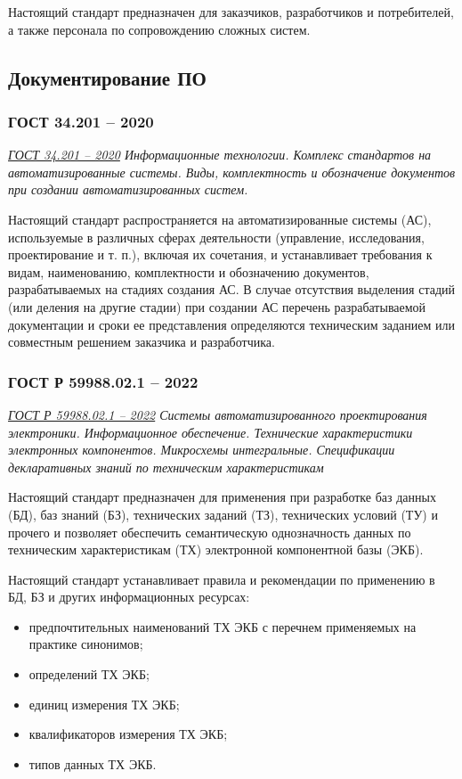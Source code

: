 Настоящий стандарт предназначен для заказчиков,
разработчиков и потребителей,
а также персонала по сопровождению сложных систем.

\subsection{Документирование ПО}

\subsubsection{ГОСТ 34.201 -- 2020}

\emph{\href{https://docs.cntd.ru/document/1200181803}{ГОСТ 34.201 -- 2020}
Информационные технологии.
Комплекс стандартов на автоматизированные системы.
Виды, комплектность и обозначение документов
при создании автоматизированных систем.
}

Настоящий стандарт распространяется на автоматизированные системы (АС),
используемые в различных сферах деятельности
(управление, исследования, проектирование и т. п.), включая их сочетания,
и устанавливает требования к видам, наименованию,
комплектности и обозначению документов, разрабатываемых на стадиях создания АС.
В случае отсутствия выделения стадий (или деления на другие стадии)
при создании АС перечень разрабатываемой документации
и сроки ее представления определяются техническим заданием
или совместным решением заказчика и разработчика.

\subsubsection{ГОСТ Р 59988.02.1 -- 2022}

\emph{\href{https://docs.cntd.ru/document/1200192137}{ГОСТ Р 59988.02.1 -- 2022}
Системы автоматизированного проектирования электроники.
Информационное обеспечение.
Технические характеристики электронных компонентов.
Микросхемы интегральные.
Спецификации декларативных знаний по техническим характеристикам
}

Настоящий стандарт предназначен для применения при разработке
баз данных (БД), баз знаний (БЗ), технических заданий (ТЗ),
технических условий (ТУ) и прочего
и позволяет обеспечить семантическую однозначность данных
по техническим характеристикам (ТХ) электронной компонентной базы (ЭКБ).

Настоящий стандарт устанавливает правила и рекомендации
по применению в БД, БЗ и других информационных ресурсах:

\begin{itemize}
	\item предпочтительных наименований ТХ ЭКБ
		с перечнем применяемых на практике синонимов;
	\item определений ТХ ЭКБ;
	\item единиц измерения ТХ ЭКБ;
	\item квалификаторов измерения ТХ ЭКБ;
	\item типов данных ТХ ЭКБ.
\end{itemize}

